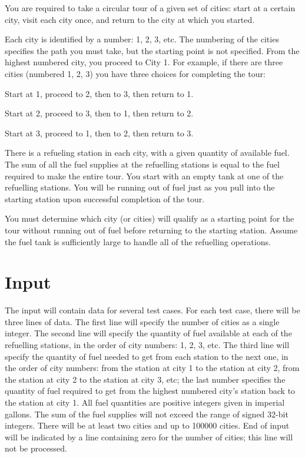 

      You are required to take a circular tour of a given set of cities: start at a certain city, visit each city once, and return to the city at which you started.

      Each city is identified by a number: 1, 2, 3, etc. The numbering of the cities specifies the path you must take, but the starting point is not specified. From the highest numbered city, you proceed to City 1. For example, if there are three cities (numbered 1, 2, 3) you have three choices for completing the tour:

      Start at 1, proceed to 2, then to 3, then return to 1.

      Start at 2, proceed to 3, then to 1, then return to 2.

      Start at 3, proceed to 1, then to 2, then return to 3.

      There is a refueling station in each city, with a given quantity of available fuel. The sum of all the fuel supplies at the refuelling stations is equal to the fuel required to make the entire tour. You start with an empty tank at one of the refuelling stations. You will be running out of fuel just as you pull into the starting station upon successful completion of the tour.

      You must determine which city (or cities) will qualify as a starting point for the tour without running out of fuel before returning to the starting station. Assume the fuel tank is sufficiently large to handle all of the refuelling operations.

\section*{Input}

      The input will contain data for several test cases. For each test case, there will be three lines of data. The first line will specify the number of cities as a single integer. The second line will specify the quantity of fuel available at each of the refuelling stations, in the order of city numbers: 1, 2, 3, etc. The third line will specify the quantity of fuel needed to get from each station to the next one, in the order of city numbers: from the station at city 1 to the station at city 2, from the station at city 2 to the station at city 3, etc; the last number specifies the quantity of fuel required to get from the highest numbered city's station back to the station at city 1. All fuel quantities are positive integers given in imperial gallons. The sum of the fuel supplies will not exceed the range of signed 32-bit integers. There will be at least two cities and up to 100000 cities. End of input will be indicated by a line containing zero for the number of cities; this line will not be processed.

